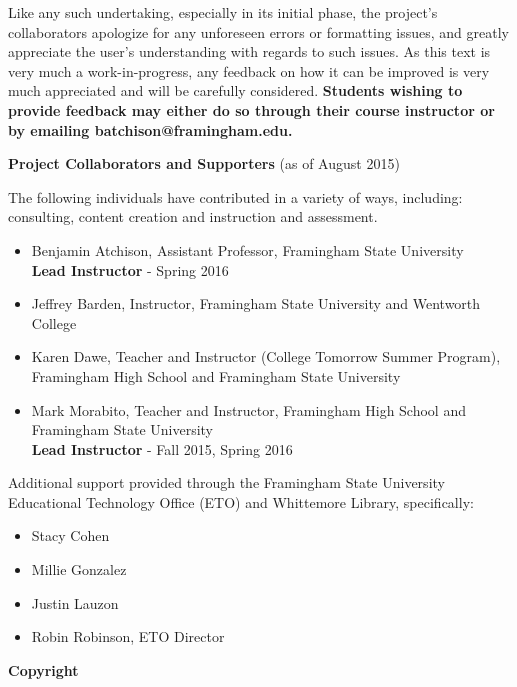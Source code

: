 \indent Like any such undertaking, especially in its initial phase, the project's collaborators apologize for any unforeseen errors or formatting issues, and greatly appreciate the user's understanding with regards to such issues.  As this text is very much a work-in-progress, any feedback on how it can be improved is very much appreciated and will be carefully considered.\pp
{\bf Students wishing to provide feedback may either do so through their course instructor or by emailing {\small batchison@framingham.edu}.}   
\par
\begin{center}\textbf{Project Collaborators and Supporters} (as of August 2015) \end{center}\par
\noindent The following individuals have contributed in a variety of ways, including: consulting, content creation and instruction and assessment.
\begin{itemize}
	\item Benjamin Atchison, Assistant Professor, Framingham State University\\{\bf Lead Instructor} - Spring 2016
	\item Jeffrey Barden, Instructor, Framingham State University and Wentworth College
	\item Karen Dawe, Teacher and Instructor (College Tomorrow Summer Program), Framingham High School and Framingham State University
	\item Mark Morabito, Teacher and Instructor, Framingham High School and Framingham State University\\{\bf Lead Instructor} - Fall 2015, Spring 2016
\end{itemize}
\pagebreak
Additional support provided through the Framingham State University Educational Technology Office (ETO) and Whittemore Library, specifically:
\begin{itemize}
	\item Stacy Cohen
	\item Millie Gonzalez
	\item Justin Lauzon
	\item Robin Robinson, ETO Director
\end{itemize}\par
\begin{center}\textbf{Copyright} \end{center}%
\doclicenseThis

